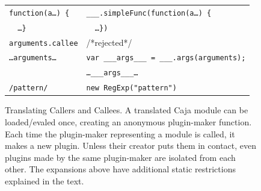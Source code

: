 \documentclass[letterpaper,twocolumn,10pt]{article}
\newcommand{\code}[1]{{\tt {#1}}}              %
\begin{document}
\begin{figure}
\begin{tabular}{ll}
  \code{function(a\ldots)\ \{} 
                 & \code{\_\_\_.simpleFunc(function(a\ldots)\ \{} \\
  \code{\ \ \ldots\}}          & \code{\ \ \ldots\})} \\
  \hline
  \code{arguments.callee}      & /*rejected*/ \\
  \code{\ldots arguments\ldots} 
                   &\code{var \_\_\_args\_\_\_ = \_\_\_.args(arguments);}\\
                   & \code{\ldots \_\_\_args\_\_\_\ldots} \\
  \hline
  \code{/pattern/} & \code{new RegExp("pattern")}
\end{tabular}

\caption[Translating Callers and Callees]{Translating Callers and Callees. A 
translated Caja module can be loaded/evaled once, creating an anonymous 
plugin-maker function. Each time the plugin-maker representing a module is 
called, it makes a new plugin. Unless their creator puts them in contact, 
even plugins made by the same plugin-maker are isolated from each other. The 
expansions above have additional static restrictions explained in the text.}
\label{tab:call-xlate}
\end{figure}
\end{document}
